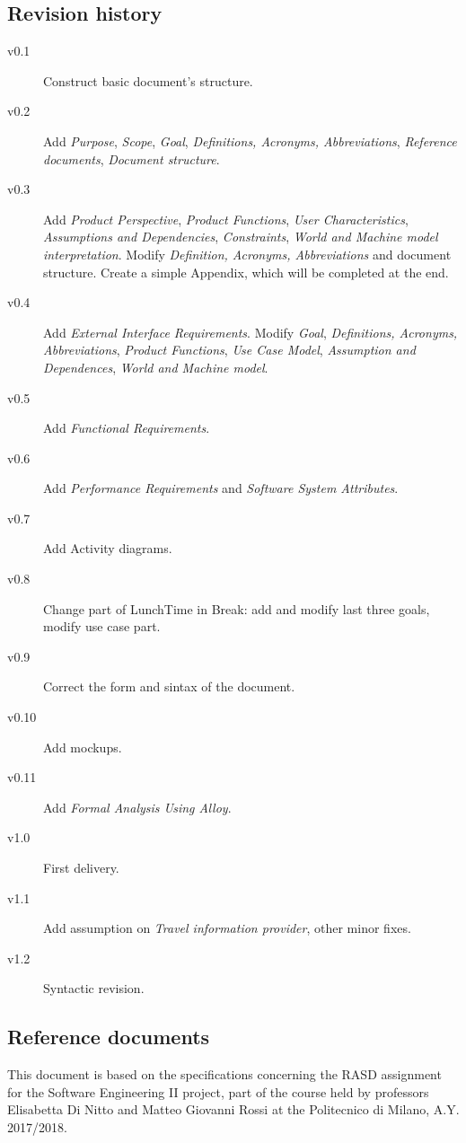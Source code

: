 \documentclass{article}
\begin{document}
	
	\subsection{Revision history}
	\begin{description}
		\item[v0.1] Construct basic document's structure.
		\item[v0.2] Add \textit{Purpose}, \textit{Scope}, \textit{Goal}, \textit{Definitions, Acronyms, Abbreviations}, \textit{Reference documents}, \textit{Document structure}.
		\item[v0.3] Add \textit{Product Perspective}, \textit{Product Functions}, \textit{User Characteristics}, \textit{Assumptions and Dependencies}, \textit{Constraints}, \textit{World and Machine model interpretation}. Modify \textit{Definition, Acronyms, Abbreviations} and document structure. Create a simple Appendix, which will be completed at the end.
		\item[v0.4] Add \textit{External Interface Requirements}. Modify \textit{Goal}, \textit{Definitions, Acronyms, Abbreviations}, \textit{Product Functions}, \textit{Use Case Model}, \textit{Assumption and Dependences}, \textit{World and Machine model}.
		\item[v0.5] Add \textit{Functional Requirements}.
		\item[v0.6] Add \textit{Performance Requirements} and \textit{Software System Attributes}.
		\item[v0.7] Add Activity diagrams.
		\item[v0.8] Change part of LunchTime in Break: add and modify last three goals, modify use case part.
		\item[v0.9] Correct the form and sintax of the document.
		\item[v0.10] Add mockups.
		\item[v0.11] Add \textit{Formal Analysis Using Alloy}.
		\item[v1.0] First delivery.
		\item[v1.1] Add assumption on \textit{Travel information provider}, other minor fixes.
		\item[v1.2] Syntactic revision.
	\end{description}
	
	
	\subsection{Reference documents}
	This document is based on the specifications concerning the RASD assignment for the Software Engineering II project, part of the course held by professors Elisabetta Di Nitto and Matteo Giovanni Rossi at the Politecnico di Milano, A.Y. 2017/2018.
	
\end{document}
